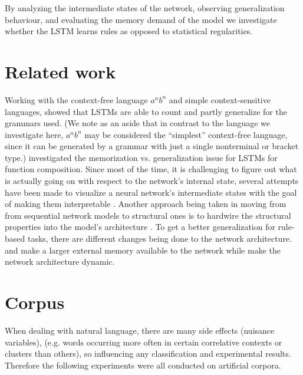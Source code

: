\documentclass[11pt,a4paper]{article}
\begin{document}
By analyzing the intermediate states of the network, observing generalization behaviour, and evaluating the memory demand of the model we investigate whether the LSTM learns rules as opposed to statistical regularities.

\section{Related work}
Working with the context-free language $a^nb^n$ and simple context-sensitive languages, \citeauthor{gers2001lstm}  showed that LSTMs are able to count and partly generalize for the grammars used.  (We note as an aside that in contrast to the language we investigate here, $a^nb^n$ may be considered the ``simplest'' context-free language, since it can be generated by a grammar with just a single nonterminal or bracket type.)
\citeauthor{liska2018memorize}  investigated the memorization vs. generalization issue for LSTMs for function composition. Since most of the time, it is challenging to figure out what is actually going on with respect to the network's internal state, several attempts have been made to visualize a neural network's intermediate states \cite{rauber2017visualizing, karpathy2015visualizing} with the goal of making them interpretable \cite{krakovna2016increasing}.
Another approach being taken in moving from from sequential network models to structural ones is to hardwire the structural properties into the model's architecture \cite{tai2015improved, kiperwasser2016simple, joulin2015inferring}.
To get a better generalization for rule-based tasks, there are different changes being done to the network architecture. \citeauthor{graves2014neural}  and \citeauthor{sukhbaatar2015end}  make a larger external memory available to the network while \citeauthor{moshe2017deep}  make the network architecture dynamic.

\section{Corpus}
\label{sec:corpus}
When dealing with natural language, there are many side effects (nuisance variables),  (e.g. words occurring more often in certain correlative contexts or clusters than others), so influencing any classification and experimental results. Therefore the following experiments were all conducted on artificial corpora.
\end{document}
